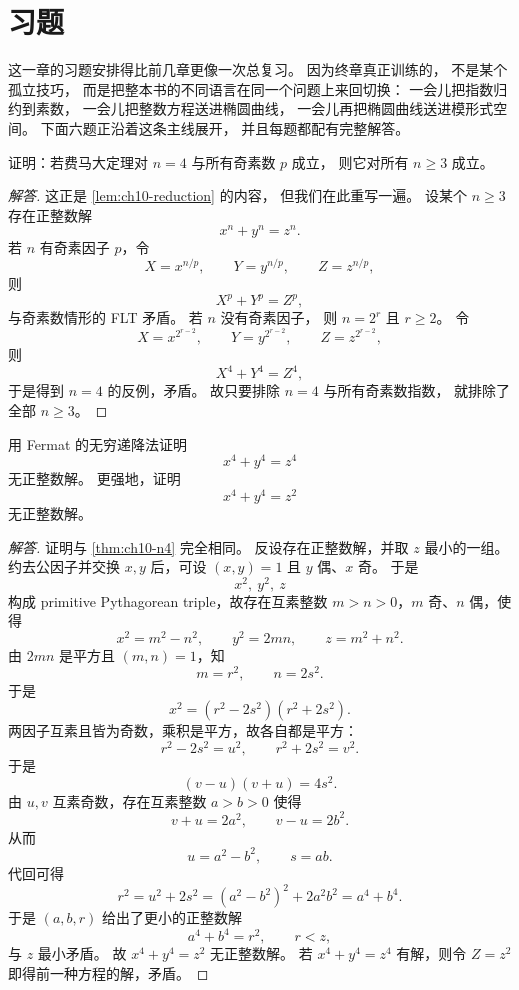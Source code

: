 \section{习题}
\label{sec:ch10-exercises}

这一章的习题安排得比前几章更像一次总复习。
因为终章真正训练的，
不是某个孤立技巧，
而是把整本书的不同语言在同一个问题上来回切换：
一会儿把指数归约到素数，
一会儿把整数方程送进椭圆曲线，
一会儿再把椭圆曲线送进模形式空间。
下面六题正沿着这条主线展开，
并且每题都配有完整解答。



\begin{exercise}
证明：若费马大定理对 $n=4$ 与所有奇素数 $p$ 成立，
则它对所有 $n\ge 3$ 成立。
\end{exercise}

\begin{proof}[解答]
这正是 \cref{lem:ch10-reduction} 的内容，
但我们在此重写一遍。
设某个 $n\ge 3$ 存在正整数解
\[
  x^n+y^n=z^n.
\]
若 $n$ 有奇素因子 $p$，令
\[
  X=x^{n/p},\qquad Y=y^{n/p},\qquad Z=z^{n/p},
\]
则
\[
  X^p+Y^p=Z^p,
\]
与奇素数情形的 FLT 矛盾。
若 $n$ 没有奇素因子，
则 $n=2^r$ 且 $r\ge 2$。
令
\[
  X=x^{2^{r-2}},\qquad Y=y^{2^{r-2}},\qquad Z=z^{2^{r-2}},
\]
则
\[
  X^4+Y^4=Z^4,
\]
于是得到 $n=4$ 的反例，矛盾。
故只要排除 $n=4$ 与所有奇素数指数，
就排除了全部 $n\ge 3$。
\end{proof}

\begin{exercise}
用 Fermat 的无穷递降法证明
\[
  x^4+y^4=z^4
\]
无正整数解。
更强地，证明
\[
  x^4+y^4=z^2
\]
无正整数解。
\end{exercise}

\begin{proof}[解答]
证明与 \cref{thm:ch10-n4} 完全相同。
反设存在正整数解，并取 $z$ 最小的一组。
约去公因子并交换 $x,y$ 后，可设 $(x,y)=1$ 且 $y$ 偶、$x$ 奇。
于是
\[
  x^2,\ y^2,\ z
\]
构成 primitive Pythagorean triple，故存在互素整数 $m>n>0$，$m$ 奇、$n$ 偶，使得
\[
  x^2=m^2-n^2,
  \qquad y^2=2mn,
  \qquad z=m^2+n^2.
\]
由 $2mn$ 是平方且 $(m,n)=1$，知
\[
  m=r^2,
  \qquad n=2s^2.
\]
于是
\[
  x^2=(r^2-2s^2)(r^2+2s^2).
\]
两因子互素且皆为奇数，乘积是平方，故各自都是平方：
\[
  r^2-2s^2=u^2,
  \qquad r^2+2s^2=v^2.
\]
于是
\[
  (v-u)(v+u)=4s^2.
\]
由 $u,v$ 互素奇数，存在互素整数 $a>b>0$ 使得
\[
  v+u=2a^2,
  \qquad v-u=2b^2.
\]
从而
\[
  u=a^2-b^2,
  \qquad s=ab.
\]
代回可得
\[
  r^2=u^2+2s^2=(a^2-b^2)^2+2a^2b^2=a^4+b^4.
\]
于是 $(a,b,r)$ 给出了更小的正整数解
\[
  a^4+b^4=r^2,
  \qquad r<z,
\]
与 $z$ 最小矛盾。
故 $x^4+y^4=z^2$ 无正整数解。
若 $x^4+y^4=z^4$ 有解，则令 $Z=z^2$ 即得前一种方程的解，矛盾。
\end{proof}

